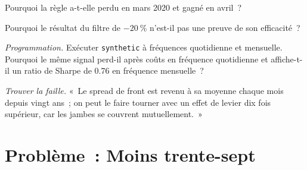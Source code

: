 \begin{exercise}[$\star\star$]\label{exo:s1:calendar-spreads-and-curve-trades:5}
Pourquoi la règle a-t-elle perdu en mars 2020 et gagné en avril~?
\end{exercise}

\begin{exercise}[$\star\star$]\label{exo:s1:calendar-spreads-and-curve-trades:6}
Pourquoi le résultat du filtre de $-20~\%$ n'est-il pas une preuve de son efficacité~?
\end{exercise}

\begin{exercise}[$\star\star\star$]\label{exo:s1:calendar-spreads-and-curve-trades:7}
\emph{Programmation.} Exécuter \texttt{synthetic} à fréquences quotidienne et mensuelle. Pourquoi le même signal perd-il après coûts en fréquence quotidienne et affiche-t-il un ratio de Sharpe de 0.76 en fréquence mensuelle~?
\end{exercise}

\begin{exercise}[$\star\star\star$]\label{exo:s1:calendar-spreads-and-curve-trades:8}
\emph{Trouver la faille.} «~Le spread de front est revenu à sa moyenne chaque mois depuis vingt ans~; on peut le faire tourner avec un effet de levier dix fois supérieur, car les jambes se
couvrent mutuellement.~»
\end{exercise}

\section{Problème~: Moins trente-sept}

